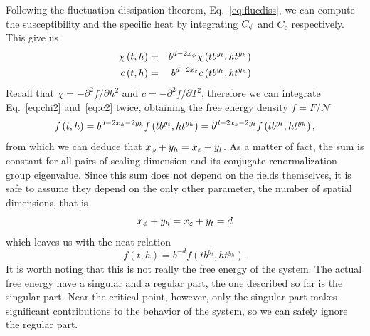 Following the fluctuation-dissipation theorem, Eq.~\ref{eq:flucdiss}, we can
compute the susceptibility and the specific heat by integrating $C_\phi$ and
$C_\varepsilon$ respectively. This give us
\begin{eqnarray}
    \label{eq:chi2}
    \chi\left(t,h\right) & = & b^{d-2x_{\phi}}\chi\left(tb^{y_{t}},ht^{y_{h}}\right)\\
    \label{eq:c2}
    c\left(t,h\right) & = & b^{d-2x_{\varepsilon}}c\left(tb^{y_{t}},ht^{y_{h}}\right)
\end{eqnarray}
Recall that $\chi=-\partial^2 f/\partial h^2$ and $c=-\partial^2 f/\partial
T^2$, therefore we can integrate Eq.~\ref{eq:chi2} and~\ref{eq:c2} twice,
obtaining the free energy density $f=F/\mathcal{N}$
\begin{equation}
    f\left(t,h\right)=
    b^{d-2x_{\phi}-2y_{h}}f\left(tb^{y_{t}},ht^{y_{h}}\right)=
    b^{d-2x_{\varepsilon}-2y_{t}}f\left(tb^{y_{t}},ht^{y_{h}}\right),
\end{equation}
from which we can deduce that $x_\phi+y_h = x_\varepsilon+y_t$. As a matter of
fact, the sum is constant for all pairs of scaling dimension and its conjugate
renormalization group eigenvalue. Since this sum does not depend on the fields
themselves, it is safe to assume they depend on the only other parameter, the
number of spatial dimensions, that is
\begin{equation}
    \label{eq:scald}
    x_\phi+y_h = x_\varepsilon+y_t = d
\end{equation}
which leaves us with the neat relation
\begin{equation}
    f\left(t,h\right)=b^{-d}f\left(tb^{y_{t}},ht^{y_{h}}\right).
\end{equation}
It is worth noting that this is not really the free energy of the system. The
actual free energy have a singular and a regular part, the one described so
far is the singular part. Near the critical point, however, only the singular
part makes significant contributions to the behavior of the system, so we can
safely ignore the regular part.

